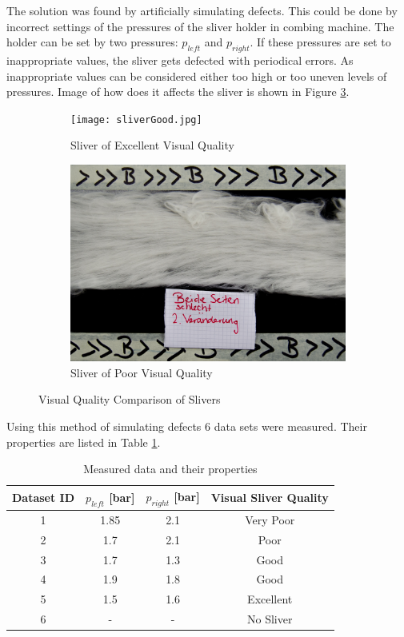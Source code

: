\documentclass[twoside]{ctuthesis}
\theoremstyle{plain}
\theoremstyle{definition}
\theoremstyle{note}
\begin{document}
The solution was found by artificially simulating defects. This could be done by incorrect settings of the pressures of the sliver holder in combing machine. The holder can be set by two pressures: $p_{left}$ and $p_{right}$. If these pressures are set to inappropriate values, the sliver gets defected with periodical errors. As inappropriate values can be considered either too high or too uneven levels of pressures. Image of how does it affects the sliver is shown in Figure \ref{fig:sliverComparison}.
\begin{figure}
	\centering
	\begin{subfigure}{0.5\textwidth}
		\centering
		\texttt{[image: sliverGood.jpg]}
		\caption{Sliver of Excellent Visual Quality}
		\label{fig:sliverGood}
	\end{subfigure}%
	\begin{subfigure}{0.5\textwidth}
		\centering
		\includegraphics[width=1.0\linewidth]{sliverBad.jpg}
		\caption{Sliver of Poor Visual Quality}
		\label{fig:sliverBad}
	\end{subfigure}
	\caption{Visual Quality Comparison of Slivers}
	\label{fig:sliverComparison}
\end{figure}
Using this method of simulating defects 6 data sets were measured. Their properties are listed in Table \ref{tab:measuredData}.
\begin{table}[htbp]
	\centering
	\caption{Measured data and their properties}
	\begin{tabular}{cccc}
		\toprule
		Dataset ID & $p_{left}$ [bar] & $p_{right}$ [bar] & Visual Sliver Quality \\
		\midrule
		1     & 1.85  & 2.1   & Very Poor \\
		2     & 1.7   & 2.1   & Poor \\
		3     & 1.7   & 1.3   & Good \\
		4     & 1.9   & 1.8   & Good \\
		5     & 1.5   & 1.6   & Excellent \\
		6     & -     & -     & No Sliver \\
		\bottomrule
	\end{tabular}%
	\label{tab:measuredData}%
\end{table}%
\end{document}
